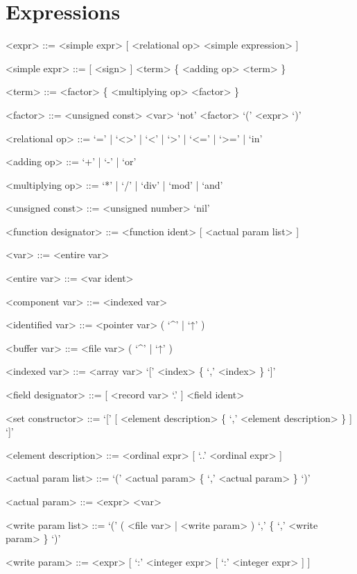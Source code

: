 \documentclass{article}
\begin{document}
\section{Expressions}

{
  \begin{grammar}
    <expr> ::= <simple expr> [ <relational op> <simple expression> ]

    <simple expr> ::= [ <sign> ] <term> \{ <adding op> <term> \}

    <term> ::= <factor> \{ <multiplying op> <factor> \}

    <factor> ::= <unsigned const>  \alt <var>   \alt `not' <factor> \alt `(' <expr> `)'

    <relational op> ::= `=' | `<>' | `<' | `>' | `<=' | `>=' | `in'

    <adding op> ::= `+' | `-' | `or'

    <multiplying op> ::= `*' | `/' | `div' | `mod' | `and'

    <unsigned const> ::= <unsigned number>   \alt `nil'

    <function designator> ::= <function ident> [ <actual param list> ]

    <var> ::= <entire var>   

    <entire var> ::= <var ident>

    <component var> ::= <indexed var> 

    <identified var> ::= <pointer var> ( `^' | `↑' )

    <buffer var> ::= <file var> ( `^' | `↑' )

    <indexed var> ::= <array var> `[' <index> \{ `,' <index> \} `]'

    <field designator> ::= [ <record var> `.' ] <field ident>

    <set constructor> ::= `[' [ <element description> \{ `,' <element description> \} ] `]'

    <element description> ::= <ordinal expr> [ `..' <ordinal expr> ]

    <actual param list> ::= `(' <actual param> \{ `,' <actual param> \} `)'

    <actual param> ::= <expr> \alt <var>  

    <write param list> ::= `(' ( <file var> | <write param> ) `,' \{  `,' <write param> \} `)'

    <write param> ::= <expr> [ `:' <integer expr> [ `:' <integer expr> ] ]
  \end{grammar}
}
\end{document}
